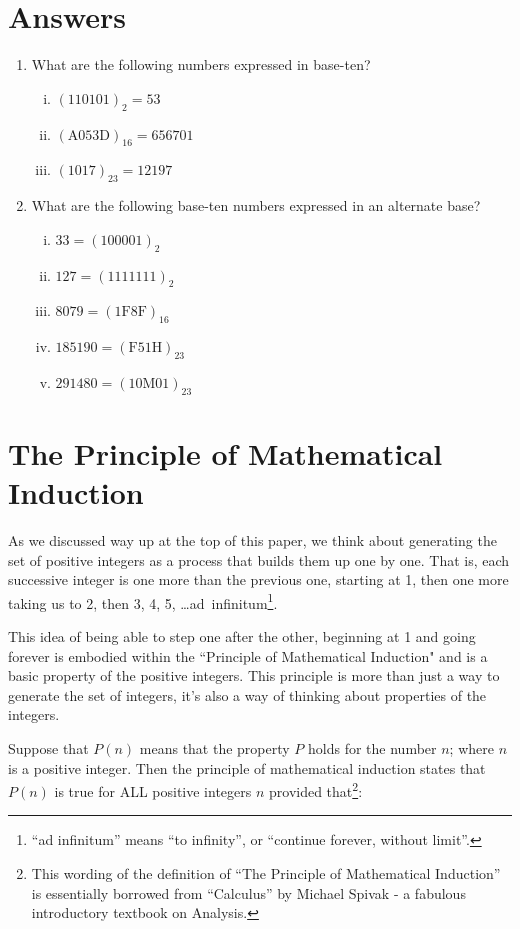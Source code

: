 \documentclass{article}
\begin{document}
\section*{Answers}
\begin{enumerate}
\item What are the following numbers expressed in base-ten?
\begin{enumerate}[i)]
\item $(110101)_2 = 53$
\item $(\text{A}053\text{D})_{16}=656701$
\item $(1017)_{23} = 12197$
\end{enumerate}
\item What are the following base-ten numbers expressed in an alternate base?
\begin{enumerate}[i)]
\item $33 = (100001)_2$
\item $127 = (1111111)_2$
\item $8079 = (1\text{F}8\text{F})_{16}$
\item $185190 = (\text{F}51\text{H})_{23}$
\item $291480 = (10\text{M}01)_{23}$
\end{enumerate}
\end{enumerate}

\break
\section*{The Principle of Mathematical Induction}

As we discussed way up at the top of this paper,
we think about generating the set of positive integers as a process that builds them up one by one.
That is, each successive integer is one more than the previous one,
starting at 1, then one more
taking us to 2,
then 3, 4, 5, \dots{}ad~infinitum\footnote{``ad
infinitum'' means ``to infinity'', or ``continue forever, without limit''.}.

This idea of being able to step one after the other,
beginning at 1 and going forever is embodied within the ``Principle of Mathematical
Induction" and is a basic property of the positive integers.
This principle is more than just a way to generate the set of integers,
it's also a way of thinking about properties of the integers.

Suppose
that $P(n)$ means that the property $P$ holds
for the number $n$; where $n$ is a positive integer.
Then the principle of mathematical induction states that $P(n)$
is true for ALL positive integers $n$ provided that\footnote{This wording of the
definition of ``The Principle of Mathematical Induction'' is essentially borrowed
from ``Calculus'' by Michael Spivak - a fabulous introductory textbook on Analysis.}:
\end{document}
